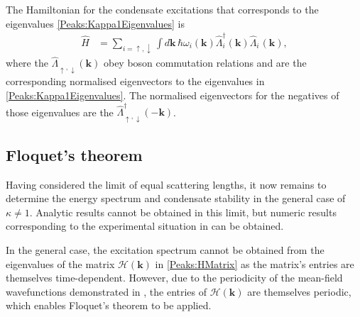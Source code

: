 The Hamiltonian for the condensate excitations that corresponds to the eigenvalues \eqref{Peaks:Kappa1Eigenvalues} is
\begin{align}
    \hat{H} &= \sum_{i=\uparrow,\downarrow}\int d\bm{k}\, \hbar \omega_i(\bm{k}) \hat{\Lambda}_i^\dagger(\bm{k}) \hat{\Lambda}_i^{\phantom{\dagger}}(\bm{k}),
\end{align}
where the $\hat{\Lambda}_{\uparrow,\downarrow}(\bm{k})$ obey boson commutation relations and are the corresponding normalised eigenvectors to the eigenvalues in \eqref{Peaks:Kappa1Eigenvalues}. The normalised eigenvectors for the negatives of those eigenvalues are the $\hat{\Lambda}_{\uparrow, \downarrow}^\dagger(-\bm{k})$.

\subsection[Floquet's theorem]{Floquet's theorem \citep{Nayfeh:1995}}
\label{Peaks:FloquetsTheorem}

Having considered the limit of equal scattering lengths, it now remains to determine the energy spectrum and condensate stability in the general case of $\kappa \neq 1$. Analytic results cannot be obtained in this limit, but numeric results corresponding to the experimental situation in  can be obtained.

In the general case, the excitation spectrum cannot be obtained from the eigenvalues of the matrix $\mathcal{H}(\bm{k})$ in \eqref{Peaks:HMatrix} as the matrix's entries are  themselves time-dependent. However, due to the periodicity of the mean-field wavefunctions demonstrated in , the entries of $\mathcal{H}(\bm{k})$ are themselves periodic, which enables Floquet's theorem to be applied.

